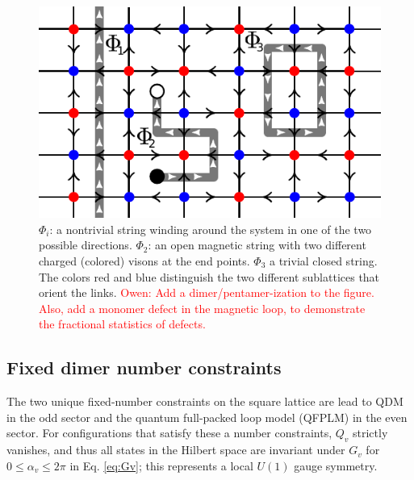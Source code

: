 \documentclass[twocolumn,prb,aps,floatfix,superscriptaddress]{revtex4-1}
\newcommand{\note}[1]{\textcolor{red}{#1}}
\newcommand{\Eqref}[1]{Eq. \eqref{#1}}
\begin{document}
\begin{figure}[tpb]
    \centering
    \includegraphics[width=1.0\columnwidth]{mag_loops_on_orntd_lat.pdf}
    \caption{$\Phi_i$: a nontrivial string winding around the system in one of the two possible
        directions. $\Phi_2$: an open
    magnetic string with two different charged (colored) visons at the end points. $\Phi_3$ a trivial closed
    string. The colors red and blue distinguish the two different sublattices that orient the links. \note{Owen: Add a dimer/pentamer-ization to the figure. Also, add a monomer defect in the magnetic loop, to demonstrate the fractional statistics of defects.}}
    \label{fig:orientedSL}
\end{figure}

\subsection{Fixed dimer number constraints}

The two unique fixed-number constraints on the square lattice are lead to QDM in the odd sector and the quantum full-packed loop model (QFPLM) in the even sector. For configurations that satisfy these a number constraints, $Q_v$ strictly vanishes, and thus all states in the Hilbert space are invariant under $G_v$ for $0 \leq \alpha_v \leq 2 \pi$ in \Eqref{eq:Gv}; this represents a local $U(1)$ gauge symmetry. 
\end{document}
